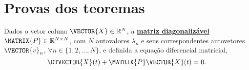 \section{Provas dos teoremas}


\begin{myproofT}\label{proof:theo:differential-eq:order1:0}
Dados o vetor coluna $\VECTOR{X} \in \mathbb{R}^N$, 
a \hyperref[def:diagonalization0]{\textbf{matriz diagonalizável}} $\MATRIX{P} \in \mathbb{R}^{N\times N}$,
com $N$ autovalores $\lambda_n$ e seus correspondentes autovetores $\VECTOR{v}_n$,
$\forall n \in \{1, 2, ..., N\}$, 
e definida a equação diferencial matricial,
\begin{equation}\label{eq:firstorder1}
\DTVECTOR{X}(t) + \MATRIX{P} \VECTOR{X}(t)=0.
\end{equation}


\end{myproofT}
